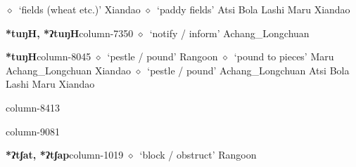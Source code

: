 \hspace{1ex}
         $\diamond$~`fields (wheat etc.)'
         Xiandao 
\hspace{1ex}
         $\diamond$~`paddy fields'
         Atsi 
\hspace{1ex}
         Bola 
\hspace{1ex}
         Lashi 
\hspace{1ex}
         Maru 
\hspace{1ex}
         Xiandao 
  \item {\footnotesize \textbf{*tuŋH, *ʔtuŋH}}{\tiny column-7350}
         $\diamond$~`notify / inform'
         Achang\_Longchuan 
  \item {\footnotesize \textbf{*tuŋH}}{\tiny column-8045}
         $\diamond$~`pestle / pound'
         Rangoon 
\hspace{1ex}
         $\diamond$~`pound to pieces'
         Maru 
\hspace{1ex}
         Achang\_Longchuan 
\hspace{1ex}
         Xiandao 
\hspace{1ex}
         $\diamond$~`pestle / pound'
         Achang\_Longchuan 
\hspace{1ex}
         Atsi 
\hspace{1ex}
         Bola 
\hspace{1ex}
         Lashi 
\hspace{1ex}
         Maru 
\hspace{1ex}
         Xiandao 
  \item {\footnotesize \textbf{}}{\tiny column-8413}
  \item {\footnotesize \textbf{}}{\tiny column-9081}
  \item {\footnotesize \textbf{*ʔtʃat, *ʔtʃap}}{\tiny column-1019}
         $\diamond$~`block / obstruct'
         Rangoon 
\hspace{1ex}
